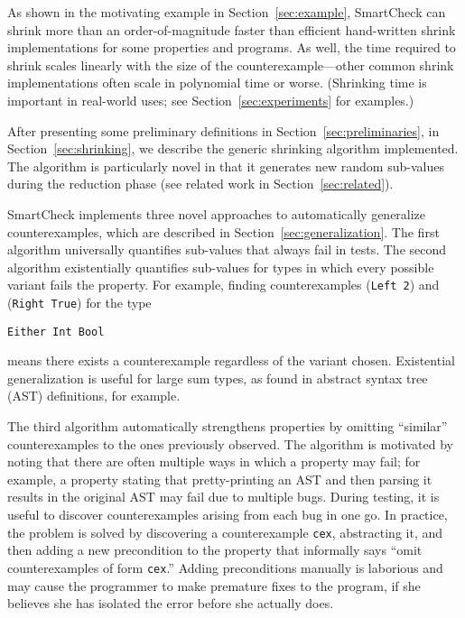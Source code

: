 \documentclass{sigplanconf}
\newenvironment{code}{\begin{alltt}\footnotesize}{\end{alltt}}
\newcommand{\ttp}[1]{\texttt{#1}}
\begin{document}
As shown in the motivating example in Section~\ref{sec:example}, SmartCheck
can shrink more than an order-of-magnitude faster than efficient hand-written
shrink implementations for some properties and programs.  As well, the time
required to shrink scales linearly with the size of the counterexample---other
common shrink implementations often scale in polynomial time or worse.
(Shrinking time is important in real-world uses; see
Section~\ref{sec:experiments} for examples.)

After presenting some preliminary definitions in
Section~\ref{sec:preliminaries}, in Section~\ref{sec:shrinking}, we describe the
generic shrinking algorithm implemented.  The algorithm is particularly novel in
that it generates new random sub-values during the reduction phase (see related
work in Section~\ref{sec:related}).



SmartCheck implements three novel approaches to automatically generalize
counterexamples, which are described in Section~\ref{sec:generalization}.  The
first algorithm universally quantifies sub-values that always fail in tests.
The second algorithm existentially quantifies sub-values for types in which
every possible variant fails the property.  For example, finding counterexamples
(\ttp{Left 2}) and (\ttp{Right True}) for the type
%
\begin{code}
\ttp{Either Int Bool}
\end{code}
%
\noindent
means there exists a counterexample regardless of the variant chosen.
Existential generalization is useful for large sum types, as found in
abstract syntax tree (AST) definitions, for example.

The third algorithm automatically strengthens properties by omitting ``similar''
counterexamples to the ones previously observed.  The algorithm is motivated by
noting that there are often multiple ways in which a property may fail; for
example, a property stating that pretty-printing an AST and then parsing it
results in the original AST may fail due to multiple bugs.  During testing, it
is useful to discover counterexamples arising from each bug in one go.  In
practice, the problem is solved by discovering a counterexample \ttp{cex},
abstracting it, and then adding a new precondition to the property that
informally says ``omit counterexamples of form \ttp{cex}.''  Adding
preconditions manually is laborious and may cause the programmer to make
premature fixes to the program, if she believes she has isolated the error
before she actually does.
\end{document}
